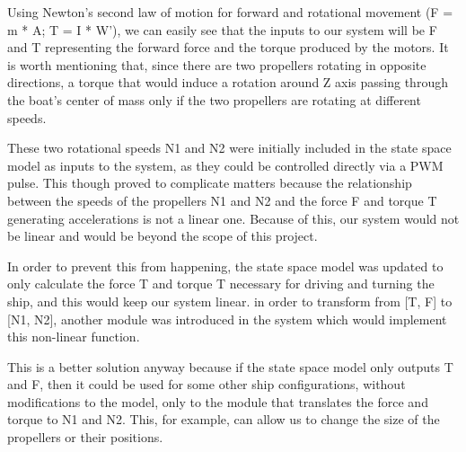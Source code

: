 Using Newton's second law of motion for forward  and rotational movement (F = m * A; T = I * W'), we can easily see that the inputs to our system will be F and T representing the forward force and the torque produced by the motors. It is worth mentioning that, since there are two propellers rotating in opposite directions, a torque that would induce a rotation around Z axis passing through the boat's center of mass only if the two propellers are rotating at different speeds.

These two rotational speeds N1 and N2 were initially included in the state space model as inputs to the system, as they could be controlled directly via a PWM pulse. This though proved to complicate matters because the relationship between the speeds of the propellers N1 and N2 and the force F and torque T generating accelerations is not a linear one. Because of this, our system would not be linear and would be beyond the scope of this project. 


In order to prevent this from happening, the state space model was updated to only calculate the force T and torque T necessary for driving and turning the ship, and this would keep our system linear. in order to transform from [T, F] to [N1, N2], another module was introduced in the system which would implement this non-linear function. 

This is a better solution anyway because if the state space model only outputs T and F, then it could be used for some other ship configurations, without modifications to the model, only to the module that translates the force and torque to N1 and N2. This, for example, can allow us to change the size of the propellers or their positions.


